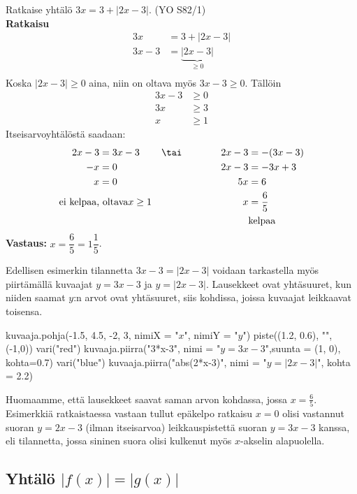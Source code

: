 \begin{esimerkki}
Ratkaise yhtälö $3x=3+|2x-3|$. (YO S82/1)\\
\textbf{Ratkaisu}\\
\begin{align*}
	3x&=3+|2x-3|  \\
	3x-3&=\underbrace{|2x-3|}_{\geq0}  \\
\end{align*}
Koska $|2x-3|\geq0$ aina, niin on oltava myös $3x-3\geq0$. Tällöin
\begin{align*}
	3x-3&\geq0 \\
	3x&\geq3 \\
	x&\geq1
\end{align*}
Itseisarvoyhtälöstä saadaan:
\begin{align*}
	2x-3&=3x-3   &\tai  \qquad \qquad 2x-3&=-(3x-3) \\
	-x&=0        &\ \                  2x-3&=-3x+3 \\
	x&=0         &\ \                  5x&=6 \\
	\text{ei kelpaa,}&\text{ oltava}x\geq1  &\ \  x&=\frac{6}{5} \\
	&\ \         &\ \                 &\text{kelpaa}
\end{align*}
\textbf{Vastaus: }$x=\dfrac{6}{5}=1\dfrac{1}{5}$.

\end{esimerkki}


Edellisen esimerkin tilannetta $3x-3=|2x-3|$ voidaan tarkastella myös piirtämällä kuvaajat $y=3x-3$ ja $y=|2x-3|$. Lausekkeet ovat yhtäsuuret, kun niiden saamat $y$:n arvot ovat yhtäsuuret, siis kohdissa, joissa kuvaajat leikkaavat toisensa.


\begin{kuva}
    kuvaaja.pohja(-1.5, 4.5, -2, 3, nimiX = "$x$", nimiY = "$y$")
    piste((1.2, 0.6), "",(-1,0))
    vari("red")
    kuvaaja.piirra("3*x-3", nimi = "$y=3x - 3$",suunta = (1, 0), kohta=0.7)
    vari("blue")
    kuvaaja.piirra("abs(2*x-3)", nimi = "$y=|2x - 3|$", kohta = 2.2)
\end{kuva}

Huomaamme, että lausekkeet saavat saman arvon kohdassa, jossa \mbox{$x=\frac{6}{5}$}. Esimerkkiä ratkaistaessa vastaan tullut epäkelpo ratkaisu $x=0$ olisi vastannut suoran $y=2x-3$ (ilman itseisarvoa) leikkauspistettä suoran $y=3x-3$ kanssa, eli tilannetta, jossa sininen suora olisi kulkenut myös $x$-akselin alapuolella.

\subsection*{Yhtälö $|f(x)|=|g(x)|$}

